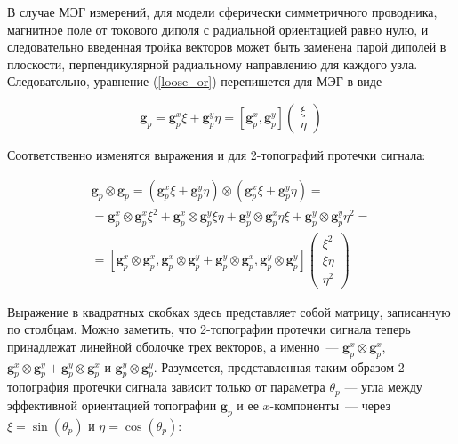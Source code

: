 В случае МЭГ измерений, для модели сферически симметричного проводника,
магнитное поле от токового диполя с радиальной ориентацией равно нулю, и следовательно
введенная тройка векторов может быть заменена парой диполей в плоскости,
перпендикулярной радиальному направлению для каждого узла.
Следовательно, уравнение (\ref{loose_or}) перепишется для МЭГ в виде

\begin{equation}
    \mathbf{g}_p = \mathbf{g}_p^x \xi + \mathbf{g}_p^y \eta = [\mathbf{g}_p^x, \mathbf{g}_p^y] \left(
    \begin{array}{ccc}
        \xi \\
        \eta
    \end{array}
    \right)
    \label{loose_or_meg}
\end{equation}

Соответственно изменятся выражения и для 2-топографий протечки сигнала:

\begin{gather}
    \mathbf{g}_p \otimes \mathbf{g}_p = (\mathbf{g}_p^x \xi
                                      + \mathbf{g}_p^y \eta) \otimes (\mathbf{g}_p^x \xi
                                      + \mathbf{g}_p^y \eta) = \nonumber \\
                                      = \mathbf{g}_p^x \otimes \mathbf{g}_p^x \xi^2
                                      + \mathbf{g}_p^x \otimes \mathbf{g}_p^y \xi \eta
                                      + \mathbf{g}_p^y\otimes  \mathbf{g}_p^x \eta \xi
                                      + \mathbf{g}_p^y \otimes \mathbf{g}_p^y \eta^2 = \nonumber \\
                                      = [\mathbf{g}_p^x \otimes \mathbf{g}_p^x,
                                         \mathbf{g}_p^x \otimes \mathbf{g}_p^y
                                      + \mathbf{g}_p^y \otimes \mathbf{g}_p^x,
                                        \mathbf{g}_p^y \otimes \mathbf{g}_p^y]
\left( \begin{array}{ccc}
\xi^2 \\
\xi \eta \\
\eta^2
\end{array}
\right)\label{eq:orient_dip_comps}
\end{gather}

Выражение в квадратных скобках здесь представляет собой матрицу, записанную по столбцам.
Можно заметить,
что 2-топографии протечки сигнала теперь принадлежат линейной оболочке трех векторов,
а именно~---
$\mathbf{g}_p^x \otimes \mathbf{g}_p^x$, $\mathbf{g}_p^x \otimes \mathbf{g}_p^y +
\mathbf{g}_p^y \otimes \mathbf{g}_p^x$ и $\mathbf{g}_p^y \otimes \mathbf{g}_p^y$.
Разумеется, представленная таким образом 2-топография протечки сигнала зависит только от параметра
$\theta_p$ --- угла между эффективной ориентацией топографии $\mathbf{g}_p$ и ее $x$-компоненты~---
через $\xi = \sin(\theta_p)$ и $\eta=\cos(\theta_p)$:

